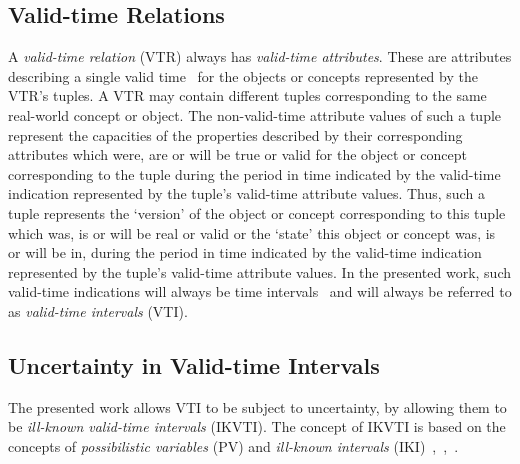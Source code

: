 \documentclass[runningheads,a4paper]{llncs}
\begin{document}
\subsection{Valid-time Relations}

A \emph{valid-time relation} (VTR) always has \emph{valid-time attributes}. These are attributes describing a single valid time~\cite{Bohlen1998lncs} for the objects or concepts represented by the VTR's tuples. A VTR may contain different tuples corresponding to the same real-world concept or object. The non-valid-time attribute values of such a tuple represent the capacities of the properties described by their corresponding attributes which were, are or will be true or valid for the object or concept corresponding to the tuple during the period in time indicated by the valid-time indication represented by the tuple's valid-time attribute values. Thus, such a tuple represents the `version' of the object or concept corresponding to this tuple which was, is or will be real or valid or the `state' this object or concept was, is or will be in, during the period in time indicated by the valid-time indication represented by the tuple's valid-time attribute values. In the presented work, such valid-time indications will always be time intervals~\cite{Bohlen1998lncs} and will always be referred to as \emph{valid-time intervals} (VTI).

\subsection{Uncertainty in Valid-time Intervals}
The presented work allows VTI to be subject to uncertainty, by allowing them to be \emph{ill-known valid-time intervals} (IKVTI). The concept of IKVTI is based on the concepts of \emph{possibilistic variables} (PV) and \emph{ill-known intervals} (IKI)~\cite{Billiet2012ipmu},~\cite{Pons2013ijufkbs},~\cite{Dubois1988cma}.
\end{document}
